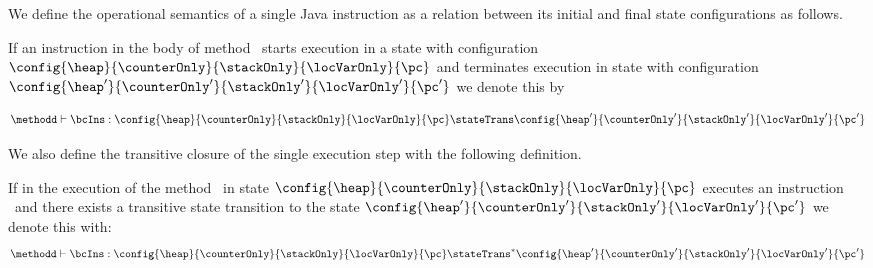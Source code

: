 


 


 We define the operational semantics of a single Java instruction  as a 
 relation between its initial and final state configurations as follows. 


 \begin{StateTransition} \label{stateTrans} 
 If an instruction \bcIns in the body of method \methodd \ starts execution in a state with configuration  
 $\config{ \heap}{\counterOnly}{\stackOnly}{\locVarOnly}{ \pc}$ 
 and terminates execution in state with configuration  $\config{ \heap'}{\counterOnly'}{\stackOnly'}{\locVarOnly'}{\pc'}$ we denote this by

  $$   \methodd \vdash \bcIns : \config{ \heap}{\counterOnly}{\stackOnly}{\locVarOnly}{ \pc }   \stateTrans \config{ \heap'}{\counterOnly'}{\stackOnly'}{\locVarOnly'}{\pc'} $$
 \end{StateTransition}

 We also define the transitive closure of the single execution step with the following definition.
 

 \begin{transClosStateTrans0}\label{stateTransit}
 If  in the execution of the method \methodd \ in  state $\config{ \heap}{\counterOnly}{\stackOnly}{\locVarOnly}{\pc}$  executes an instruction \bcIns{} \ and
 there exists  a transitive state transition  to the state $\config{ \heap'}{\counterOnly'}{\stackOnly'}{\locVarOnly'}{\pc'}$ we denote this with:
$$  \methodd \vdash \bcIns :\config{ \heap}{\counterOnly}{\stackOnly}{\locVarOnly}{\pc} \stateTrans^{*} \config{ \heap'}{\counterOnly'}{\stackOnly'}{\locVarOnly'}{\pc'} $$ 
\end{transClosStateTrans0}


